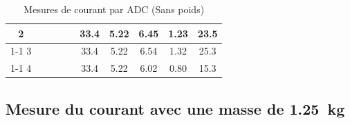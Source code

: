 \begin{table}[H]
{\begin{tabular}{|c|c|c|c|c|c|c|c|c|c|}
            2         &                                                            &                           &                                                                                        &                                                          & 33.4                                                    & 5.22                                                                & 6.45                                                  & 1.23   & 23.5                                                               \\ \cline{1-1} \cline{6-10}
            3         &                                                            &                           &                                                                                        &                                                          & 33.4                                                    & 5.22                                                                & 6.54                                                  & 1.32   & 25.3                                                               \\ \cline{1-1} \cline{6-10}
            4         &                                                            &                           &                                                                                        &                                                          & 33.4                                                    & 5.22                                                                & 6.02                                                  & 0.80   & 15.3                                                               \\ \hline
        \end{tabular}%
    }
    \caption{Mesures de courant par ADC (Sans poids)}
    \label{tab:sans_poids_adc}
\end{table}

\subsection{Mesure du courant avec une masse de 1.25~kg}

